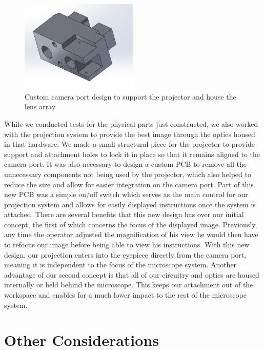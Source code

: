 \documentclass[12pt,a4paper]{article}
\begin{document}
\begin{appendices}
\begin{figure}[h]
	\centering
	\includegraphics[width = 0.5\textwidth]{pics/camera_port.jpg}
	\caption[Camera Port Model]{\centering Custom camera port design to support the projector and house the lens array}
	\label{CPM}
\end{figure}

While we conducted tests for the physical parts just constructed, we also worked with the projection system to provide the best image through the optics housed in that hardware.  We made a small structural piece for the projector to provide support and attachment holes to lock it in place so that it remains aligned to the camera port. It was also necessary to design a custom PCB to remove all the unnecessary components not being used by the projector, which also helped to reduce the size and allow for easier integration on the camera port.  Part of this new PCB was a simple on/off switch which serves as the main control for our projection system and allows for easily displayed instructions once the system is attached.
There are several benefits that this new design has over our initial concept, the first of which concerns the focus of the displayed image.  Previously, any time the operator adjusted the magnification of his view he would then have to refocus our image before being able to view his instructions.  With this new design, our projection enters into the eyepiece directly from the camera port, meaning it is independent to the focus of the microscope system.  Another advantage of our second concept is that all of our circuitry and optics are housed internally or held behind the microscope.  This keeps our attachment out of the workspace and enables for a much lower impact to the rest of the microscope system.


\section{Other Considerations}


\end{appendices}
\end{document}
